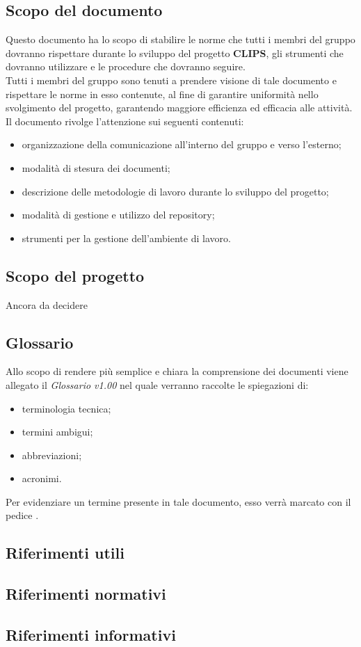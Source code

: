 \documentclass[../NormeProgetto.tex]{subfiles}
\begin{document}
	\subsection{Scopo del documento}
	Questo documento ha lo scopo di stabilire le norme che tutti i membri del gruppo \leaf dovranno rispettare durante lo sviluppo del progetto \textbf{CLIPS}, gli strumenti che dovranno utilizzare e le procedure che dovranno seguire. \\
	Tutti i membri del gruppo sono tenuti a prendere visione di tale documento e rispettare le norme in esso contenute, al fine di garantire uniformità nello svolgimento del progetto, garantendo maggiore efficienza ed efficacia alle attività. \\
	Il documento rivolge l'attenzione sui seguenti contenuti:
	\begin{itemize}
	\item organizzazione della comunicazione all'interno del gruppo e verso l'esterno;
	\item modalità di stesura dei documenti;
	\item descrizione delle metodologie di lavoro durante lo sviluppo del progetto;
	\item modalità di gestione e utilizzo del repository\g;
	\item strumenti per la gestione dell'ambiente di lavoro.
	\end{itemize}

	\subsection{Scopo del progetto}
	Ancora da decidere
	
	\subsection{Glossario}
	Allo scopo di rendere più semplice e chiara la comprensione dei documenti viene allegato il \textit{Glossario v1.00} nel quale verranno raccolte le spiegazioni di:
	\begin{itemize}
	\item terminologia tecnica;
	\item termini ambigui;
	\item abbreviazioni;
	\item acronimi.
	\end{itemize}
	Per evidenziare un termine presente in tale documento, esso verrà marcato con il pedice \g.
	
	\subsection{Riferimenti utili}

	\subsection{Riferimenti normativi}

	\subsection{Riferimenti informativi}
\end{document}
